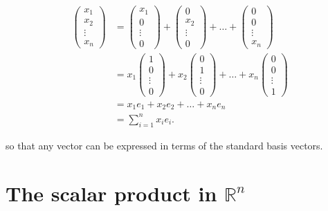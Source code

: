 \begin{align*}
    \begin{pmatrix}
        x_1\\
        x_2\\
        \vdots\\
        x_n
    \end{pmatrix}
    &=
    \begin{pmatrix}
        x_1\\
        0\\
        \vdots\\
        0
    \end{pmatrix}
    +
    \begin{pmatrix}
        0\\
        x_2\\
        \vdots\\
        0
    \end{pmatrix}
    +
    \ldots
    +
    \begin{pmatrix}
        0\\
        0\\
        \vdots\\
        x_n
    \end{pmatrix}\\
    &=x_1
    \begin{pmatrix}
        1\\
        0\\
        \vdots\\
        0
    \end{pmatrix}
    +
    x_2
    \begin{pmatrix}
        0\\
        1\\
        \vdots\\
        0
    \end{pmatrix}
    + \ldots + x_n
    \begin{pmatrix}
        0\\
        0\\
        \vdots\\
        1
    \end{pmatrix}\\
    &=x_1e_1+x_2e_2+\ldots+x_ne_n\\
    &=\sum^n_{i=1}{x_ie_i}.
\end{align*}

so that any vector can be expressed in terms of the standard basis vectors.


\section{The scalar product in $\mathbb R^n$}

